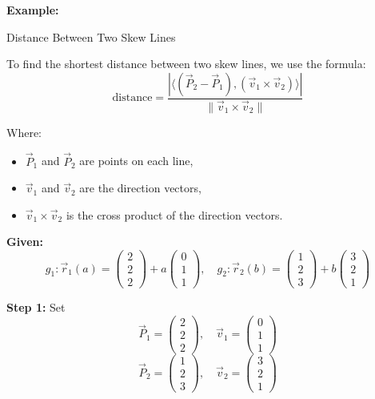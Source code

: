 \textbf{Example:} 

Distance Between Two Skew Lines

To find the shortest distance between two skew lines, we use the formula:
\[
	\text{distance} = \frac{|\langle(\vec{P}_2 - \vec{P}_1), (\vec{v}_1 \times \vec{v}_2)\rangle|}{\|\vec{v}_1 \times \vec{v}_2\|}
\]

Where:
\begin{itemize}[label=\(-\)]
	\item \(\vec{P}_1\) and \(\vec{P}_2\) are points on each line,
	\item \(\vec{v}_1\) and \(\vec{v}_2\) are the direction vectors,
	\item \(\vec{v}_1 \times \vec{v}_2\) is the cross product of the direction vectors.
\end{itemize}

\textbf{Given:}
\[
	g_1: \vec{r}_1(a) = \begin{pmatrix} 2 \\ 2 \\ 2 \end{pmatrix} + a \begin{pmatrix} 0 \\ 1 \\ 1 \end{pmatrix}, \quad
	g_2: \vec{r}_2(b) = \begin{pmatrix} 1 \\ 2 \\ 3 \end{pmatrix} + b \begin{pmatrix} 3 \\ 2 \\ 1 \end{pmatrix}
\]

\textbf{Step 1:} Set
\[
	\vec{P}_1 = \begin{pmatrix} 2 \\ 2 \\ 2 \end{pmatrix}, \quad \vec{v}_1 = \begin{pmatrix} 0 \\ 1 \\ 1 \end{pmatrix}
\]
\[
	\vec{P}_2 = \begin{pmatrix} 1 \\ 2 \\ 3 \end{pmatrix}, \quad \vec{v}_2 = \begin{pmatrix} 3 \\ 2 \\ 1 \end{pmatrix}
\]

